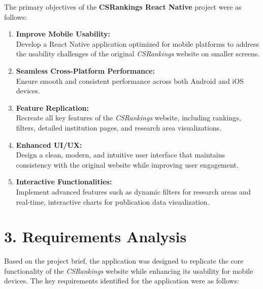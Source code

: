 \documentclass[12pt]{article}
\begin{document}
The primary objectives of the \textbf{CSRankings React Native} project were as follows:

\begin{enumerate}
    \item \textbf{Improve Mobile Usability:} \\
    Develop a React Native application optimized for mobile platforms to address the usability challenges of the original \textit{CSRankings} website on smaller screens.
    
    \item \textbf{Seamless Cross-Platform Performance:} \\
    Ensure smooth and consistent performance across both Android and iOS devices.
    
    \item \textbf{Feature Replication:} \\
    Recreate all key features of the \textit{CSRankings} website, including rankings, filters, detailed institution pages, and research area visualizations.
    
    \item \textbf{Enhanced UI/UX:} \\
    Design a clean, modern, and intuitive user interface that maintains consistency with the original website while improving user engagement.
    
    \item \textbf{Interactive Functionalities:} \\
    Implement advanced features such as dynamic filters for research areas and real-time, interactive charts for publication data visualization.
\end{enumerate}

\bigskip
\section*{3. Requirements Analysis}

Based on the project brief, the application was designed to replicate the core functionality of the \textit{CSRankings} website while enhancing its usability for mobile devices. The key requirements identified for the application were as follows:
\end{document}
